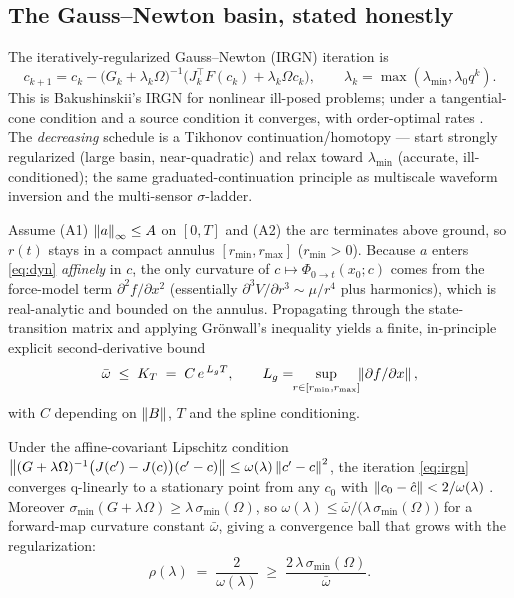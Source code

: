 \subsection{The Gauss--Newton basin, stated honestly}

The iteratively-regularized Gauss--Newton (IRGN) iteration is
\begin{equation}
c_{k+1}=c_k-\big(G_k+\lambda_k\Omega\big)^{-1}
 \big(J_k^{\!\top}F(c_k)+\lambda_k\Omega c_k\big),\qquad
\lambda_k=\max(\lambda_{\min},\lambda_0 q^{k}).
\label{eq:irgn}
\end{equation}
This is Bakushinskii's IRGN for nonlinear ill-posed problems; under a
tangential-cone condition and a source condition it converges, with
order-optimal rates \cite{bakushinskii1992,kaltenbacher2008}. The
\emph{decreasing} schedule is a Tikhonov continuation/homotopy --- start
strongly regularized (large basin, near-quadratic) and relax toward
$\lambda_{\min}$ (accurate, ill-conditioned); the same graduated-continuation
principle as multiscale waveform inversion \cite{bunks1995} and the
multi-sensor $\sigma$-ladder.

\begin{lemma}
\label{lem:curv}
Assume \textup{(A1)} $\left\lVert a\right\rVert_\infty\le A$ on $[0,T]$ and
\textup{(A2)} the arc terminates above ground, so $r(t)$ stays in a
compact annulus $[r_{\min},r_{\max}]$ ($r_{\min}>0$). Because $a$ enters
\eqref{eq:dyn} \emph{affinely} in $c$, the only curvature of
$c\mapsto\Phi_{0\to t}(x_0;c)$ comes from the force-model term
$\partial^{2}f/\partial x^{2}$ (essentially $\partial^{3}V/\partial
r^{3}\sim\mu/r^{4}$ plus harmonics), which is real-analytic and bounded on
the annulus. Propagating through the state-transition matrix and applying
Gr\"onwall's inequality \cite{hairer1993} yields a finite, in-principle
explicit second-derivative bound
\begin{equation}
\bar\omega \;\le\; K_T \;=\; C\,e^{\,L_g T},\qquad
 L_g=\!\!\sup_{r\in[r_{\min},r_{\max}]}\!\!\left\lVert\partial f/\partial x\right\rVert,
\label{eq:KT}
\end{equation}
with $C$ depending on $\left\lVert B\right\rVert$, $T$ and the spline conditioning.
\end{lemma}

\begin{proposition}
\label{prop:basin}
Under the affine-covariant Lipschitz condition
$\left\lVert(G+\lambda\Omega)^{-1}\big(J(c')-J(c)\big)(c'-c)\right\rVert\le
\omega(\lambda)\left\lVert c'-c\right\rVert^{2}$, the iteration \eqref{eq:irgn} converges
q-linearly to a stationary point from any $c_0$ with
$\left\lVert c_0-\hat c\right\rVert<2/\omega(\lambda)$ \cite{deuflhard2004,nocedal2006}.
Moreover $\sigma_{\min}(G+\lambda\Omega)\ge\lambda\,\sigma_{\min}(\Omega)$,
so $\omega(\lambda)\le \bar\omega/\big(\lambda\,\sigma_{\min}(\Omega)\big)$
for a forward-map curvature constant $\bar\omega$, giving a convergence
ball that grows with the regularization:
\begin{equation}
\rho(\lambda)\;=\;\frac{2}{\omega(\lambda)}\;\ge\;
 \frac{2\,\lambda\,\sigma_{\min}(\Omega)}{\bar\omega}.
\label{eq:rho}
\end{equation}
\end{proposition}

